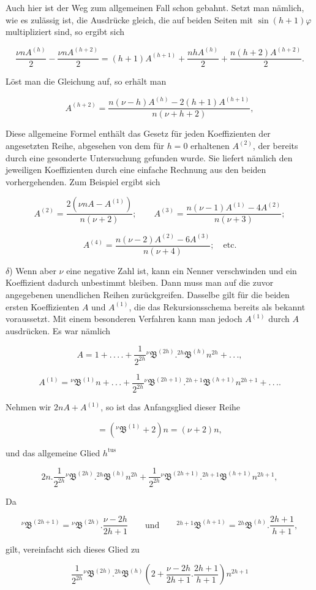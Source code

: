 \noindent Auch hier ist der Weg zum allgemeinen Fall schon gebahnt. Setzt man nämlich, wie es zulässig ist, die Ausdrücke gleich, die auf beiden Seiten mit $\sin(h+1)\varphi$ multipliziert sind, so ergibt sich

\[
\frac{\nu nA^{(h)}}{2}-\frac{\nu nA^{(h+2)}}{2}=(h+1)A^{(h+1)}+\frac{nhA^{(h)}}{2}+\frac{n(h+2)A^{(h+2)}}{2}.
\]

\noindent Löst man die Gleichung auf, so erhält man

\[
A^{(h+2)}=\frac{n(\nu-h)A^{(h)}-2(h+1)A^{(h+1)}}{n(\nu+h+2)},
\]

\noindent Diese allgemeine Formel enthält das Gesetz für jeden Koeffizienten der angesetzten Reihe, abgesehen von dem für $h=0$ erhaltenen $A^{(2)}$, der bereits durch eine gesonderte Untersuchung gefunden wurde. Sie liefert nämlich den jeweiligen Koeffizienten durch eine einfache Rechnung aus den beiden vorhergehenden. Zum Beispiel ergibt sich

\[
A^{(2)}=\frac{2(\nu nA-A^{(1)})}{n(\nu+2)};\qquad A^{(3)}=\frac{n(\nu-1)A^{(1)}-4A^{(2)}}{n(\nu+3)};
\]

\[
A^{(4)}=\frac{n(\nu-2)A^{(2)}-6A^{(3)}}{n(\nu+4)};\quad\mbox{etc.}
\]

$\delta$) Wenn aber $\nu$ eine negative Zahl ist, kann ein Nenner verschwinden und ein Koeffizient dadurch unbestimmt bleiben. Dann muss man auf die zuvor angegebenen unendlichen Reihen zurückgreifen. Dasselbe gilt für die beiden ersten Koeffizienten $A$ und $A^{(1)}$, die das Rekursionsschema bereits als bekannt voraussetzt. Mit einem besonderen Verfahren kann man jedoch $A^{(1)}$ durch $A$ ausdrücken. Es war nämlich

\[
A=1+.\,.\,.\,.+\frac{1}{2^{2h}}{}^{\nu}\mathfrak{B}^{(2h)}.{}^{2h}\mathfrak{B}^{(h)}n^{2h}+.\,.\,.,
\]

\[
A^{(1)}={}^{\nu}\mathfrak{B}^{(1)}n+.\,.\,.+\frac{1}{2^{2h}}{}^{\nu}\mathfrak{B}^{(2h+1)}.{}^{2h+1}\mathfrak{B}^{(h+1)}n^{2h+1}+.\,.\,..
\]

\noindent Nehmen wir $2nA+A^{(1)}$, so ist das Anfangsglied dieser Reihe

\[
=({}^{\nu}\mathfrak{B}^{(1)}+2)n=(\nu+2)n,
\]

\noindent und das allgemeine Glied $h^{\text{tus}}$

\[
2n . \frac{1}{2^{2h}}{}^{\nu}\mathfrak{B}^{(2h)}.{}^{2h}\mathfrak{B}^{(h)}n^{2h}+\frac{1}{2^{2h}}{}^{\nu}\mathfrak{B}^{(2h+1)}.{}^{2h+1}\mathfrak{B}^{(h+1)}n^{2h+1},
\]

\noindent Da

\[
{}^{\nu}\mathfrak{B}^{(2h+1)}={}^{\nu}\mathfrak{B}^{(2h)} . \frac{\nu-2h}{2h+1}\qquad\mbox{und}\qquad {}^{2h+1}\mathfrak{B}^{(h+1)}={}^{2h}\mathfrak{B}^{(h)} . \frac{2h+1}{h+1},
\]

\noindent gilt, vereinfacht sich dieses Glied zu

\[
\frac{1}{2^{2h}}{}^{\nu}\mathfrak{B}^{(2h)}.{}^{2h}\mathfrak{B}^{(h)}\left(2+\frac{\nu-2h}{2h+1} . \frac{2h+1}{h+1}\right)n^{2h+1}
\]

